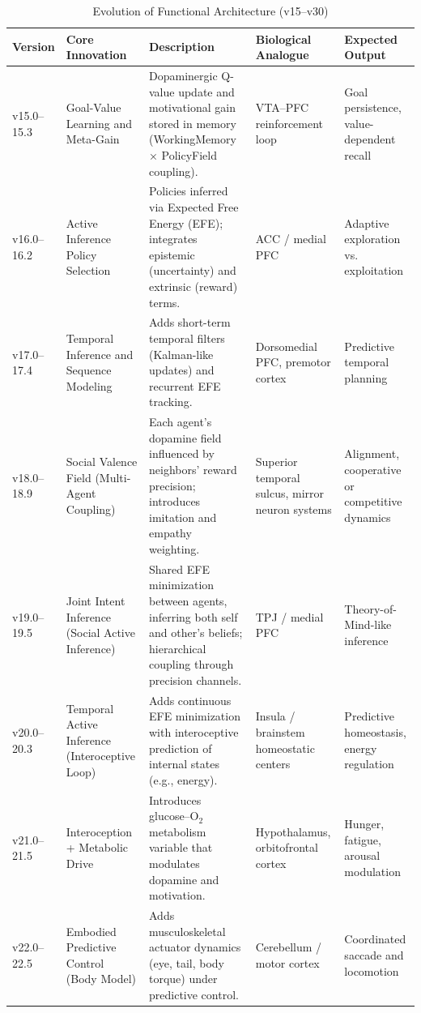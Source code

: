 \documentclass[9pt]{elife}
\begin{document}
\begin{table}[h!]
\centering
\caption{Evolution of Functional Architecture (v15–v30)}
\renewcommand{\arraystretch}{1.2}
\begin{tabular}{p{1.8cm} p{3.5cm} p{6.5cm} p{3.5cm} p{3.5cm}}
\hline
\textbf{Version} & \textbf{Core Innovation} & \textbf{Description} & \textbf{Biological Analogue} & \textbf{Expected Output} \\
\hline
v15.0–15.3 & Goal-Value Learning and Meta-Gain & Dopaminergic Q-value update and motivational gain stored in memory (WorkingMemory × PolicyField coupling). & VTA–PFC reinforcement loop & Goal persistence, value-dependent recall \\
v16.0–16.2 & Active Inference Policy Selection & Policies inferred via Expected Free Energy (EFE); integrates epistemic (uncertainty) and extrinsic (reward) terms. & ACC / medial PFC & Adaptive exploration vs. exploitation \\
v17.0–17.4 & Temporal Inference and Sequence Modeling & Adds short-term temporal filters (Kalman-like updates) and recurrent EFE tracking. & Dorsomedial PFC, premotor cortex & Predictive temporal planning \\
v18.0–18.9 & Social Valence Field (Multi-Agent Coupling) & Each agent’s dopamine field influenced by neighbors’ reward precision; introduces imitation and empathy weighting. & Superior temporal sulcus, mirror neuron systems & Alignment, cooperative or competitive dynamics \\
v19.0–19.5 & Joint Intent Inference (Social Active Inference) & Shared EFE minimization between agents, inferring both self and other’s beliefs; hierarchical coupling through precision channels. & TPJ / medial PFC & Theory-of-Mind-like inference \\
v20.0–20.3 & Temporal Active Inference (Interoceptive Loop) & Adds continuous EFE minimization with interoceptive prediction of internal states (e.g., energy). & Insula / brainstem homeostatic centers & Predictive homeostasis, energy regulation \\
v21.0–21.5 & Interoception + Metabolic Drive & Introduces glucose–O$_2$ metabolism variable that modulates dopamine and motivation. & Hypothalamus, orbitofrontal cortex & Hunger, fatigue, arousal modulation \\
v22.0–22.5 & Embodied Predictive Control (Body Model) & Adds musculoskeletal actuator dynamics (eye, tail, body torque) under predictive control. & Cerebellum / motor cortex & Coordinated saccade and locomotion \\

\end{tabular}
\end{table}
\end{document}
